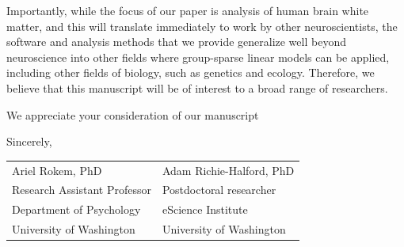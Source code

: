 \documentclass[11pt,letterpaper]{letter} %
\begin{document}
\begin{letter}{}
Importantly, while the focus of our paper is analysis of human brain white
matter, and this will translate immediately to work by other neuroscientists,
the software and analysis methods that we provide generalize well beyond
neuroscience into other fields where group-sparse linear models can be applied,
including other fields of biology, such as genetics and ecology. Therefore, we
believe that this manuscript will be of interest to a broad range of
researchers.

We appreciate your consideration of our manuscript

\hspace{1cm} Sincerely,\\

\begin{minipage}{0.8\linewidth}
\hspace{1cm}\begin{tabular}{ll}
Ariel Rokem, PhD & \hspace{1cm} Adam Richie-Halford, PhD\\
Research Assistant Professor & \hspace{1cm}  Postdoctoral researcher \\
Department of Psychology & \hspace{1cm} eScience Institute \\
University of Washington & \hspace{1cm} University of Washington
 \end{tabular}
\end{minipage}


\end{letter}
\end{document}
